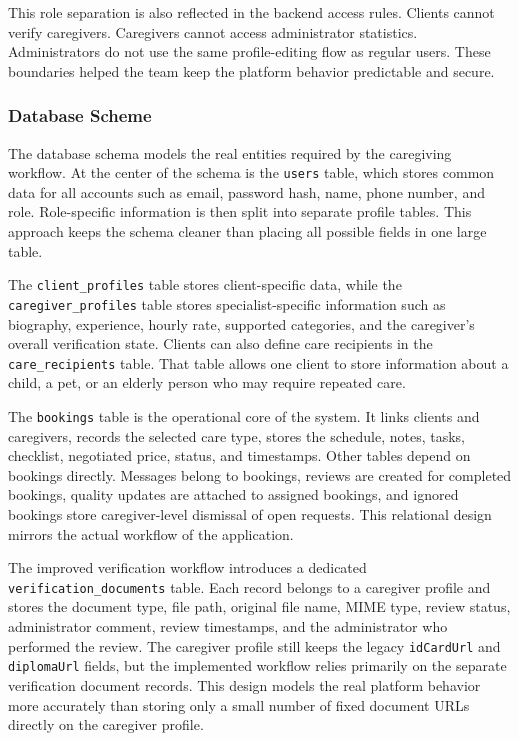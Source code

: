 \documentclass[12pt,a4paper]{article}
\begin{document}
This role separation is also reflected in the backend access rules. Clients cannot verify caregivers. Caregivers cannot access administrator statistics. Administrators do not use the same profile-editing flow as regular users. These boundaries helped the team keep the platform behavior predictable and secure.

\subsubsection{Database Scheme}

The database schema models the real entities required by the caregiving workflow. At the center of the schema is the \texttt{users} table, which stores common data for all accounts such as email, password hash, name, phone number, and role. Role-specific information is then split into separate profile tables. This approach keeps the schema cleaner than placing all possible fields in one large table.

The \texttt{client\_profiles} table stores client-specific data, while the \texttt{caregiver\_profiles} table stores specialist-specific information such as biography, experience, hourly rate, supported categories, and the caregiver's overall verification state. Clients can also define care recipients in the \texttt{care\_recipients} table. That table allows one client to store information about a child, a pet, or an elderly person who may require repeated care.

The \texttt{bookings} table is the operational core of the system. It links clients and caregivers, records the selected care type, stores the schedule, notes, tasks, checklist, negotiated price, status, and timestamps. Other tables depend on bookings directly. Messages belong to bookings, reviews are created for completed bookings, quality updates are attached to assigned bookings, and ignored bookings store caregiver-level dismissal of open requests. This relational design mirrors the actual workflow of the application.

The improved verification workflow introduces a dedicated \texttt{verification\_documents} table. Each record belongs to a caregiver profile and stores the document type, file path, original file name, MIME type, review status, administrator comment, review timestamps, and the administrator who performed the review. The caregiver profile still keeps the legacy \texttt{idCardUrl} and \texttt{diplomaUrl} fields, but the implemented workflow relies primarily on the separate verification document records. This design models the real platform behavior more accurately than storing only a small number of fixed document URLs directly on the caregiver profile.
\end{document}
